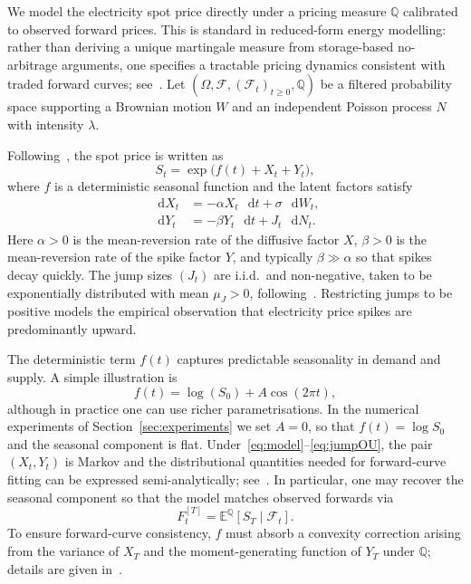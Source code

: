 \documentclass[a4paper,fleqn]{cas-dc}
\newcommand*\D{\mathop{}\!\mathrm{d}}
\begin{document}
We model the electricity spot price directly under a pricing measure $\mathbb{Q}$ calibrated to observed forward prices. This is standard in reduced-form energy modelling: rather than deriving a unique martingale measure from storage-based no-arbitrage arguments, one specifies a tractable pricing dynamics consistent with traded forward curves; see~\cite{lucia2002electricity,cartea2005pricing,Hambly2009}. Let $(\Omega,\mathcal{F},(\mathcal{F}_t)_{t \ge 0},\mathbb{Q})$ be a filtered probability space supporting a Brownian motion $W$ and an independent Poisson process $N$ with intensity $\lambda$.

Following~\cite{Hambly2009}, the spot price is written as
\begin{equation}
\label{eq:model}
S_t = \exp\!\bigl(f(t) + X_t + Y_t\bigr),
\end{equation}
where $f$ is a deterministic seasonal function and the latent factors satisfy
\begin{align}
\D X_t &= -\alpha X_t \,\D t + \sigma \,\D W_t, \label{eq:OU}\\
\D Y_t &= -\beta Y_t \,\D t + J_t \,\D N_t. \label{eq:jumpOU}
\end{align}
Here $\alpha > 0$ is the mean-reversion rate of the diffusive factor $X$, $\beta > 0$ is the mean-reversion rate of the spike factor $Y$, and typically $\beta \gg \alpha$ so that spikes decay quickly. The jump sizes $(J_t)$ are i.i.d.\ and non-negative, taken to be exponentially distributed with mean $\mu_J > 0$, following~\cite{Hambly2009,cartea2005pricing}. Restricting jumps to be positive models the empirical observation that electricity price spikes are predominantly upward.

The deterministic term $f(t)$ captures predictable seasonality in demand and supply. A simple illustration is
\[
f(t) = \log(S_0) + A \cos(2 \pi t),
\]
although in practice one can use richer parametrisations. In the numerical experiments of Section~\ref{sec:experiments} we set $A = 0$, so that $f(t) = \log S_0$ and the seasonal component is flat. Under~\eqref{eq:model}--\eqref{eq:jumpOU}, the pair $(X_t,Y_t)$ is Markov and the distributional quantities needed for forward-curve fitting can be expressed semi-analytically; see~\cite{Hambly2009}. In particular, one may recover the seasonal component so that the model matches observed forwards via
\[
F_t^{[T]} = \mathbb{E}^{\mathbb{Q}}[S_T \mid \mathcal{F}_t].
\]
To ensure forward-curve consistency, $f$ must absorb a convexity correction arising from the variance of $X_T$ and the moment-generating function of $Y_T$ under $\mathbb{Q}$; details are given in~\cite{Hambly2009}.
\end{document}
